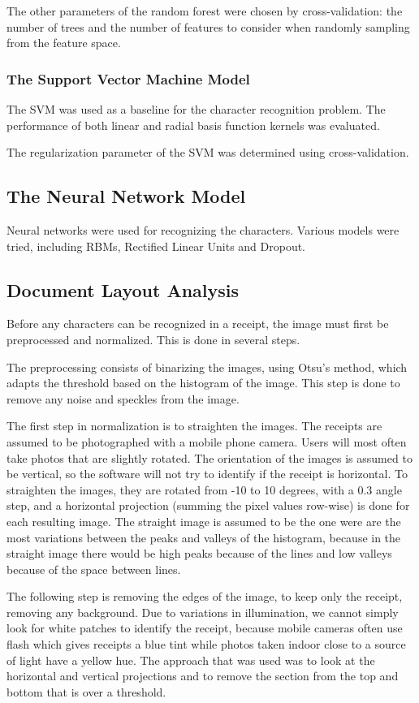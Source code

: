 The other parameters of the random forest were chosen by cross-validation: the number of trees and the number of features to consider when randomly sampling from the feature space. 

\subsubsection{The Support Vector Machine Model}
The SVM was used as a baseline for the character recognition problem. The performance of both linear and radial basis function kernels was evaluated. 

The regularization parameter of the SVM was determined using cross-validation. 

\subsection{The Neural Network Model}
Neural networks were used for recognizing the characters. Various models were tried, including RBMs, Rectified Linear Units and Dropout. 


\subsection{Document Layout Analysis}
Before any characters can be recognized in a receipt, the image must first be preprocessed and normalized. This is done in several steps. 

The preprocessing consists of binarizing the images, using Otsu's method\cite{otsu1975threshold}, which adapts the threshold based on the histogram of the image. This step is done to remove any noise and speckles from the image. 

The first step in normalization is to straighten the images. The receipts are assumed to be photographed with a mobile phone camera. Users will most often take photos that are slightly rotated. The orientation of the images is assumed to be vertical, so the software will not try to identify if the receipt is horizontal. To straighten the images, they are rotated from -10 to 10 degrees, with a 0.3 angle step, and a horizontal projection (summing the pixel values row-wise) is done for each resulting image. The straight image is assumed to be the one were are the most variations between the peaks and valleys of the histogram, because in the straight image there would be high peaks because of the lines and low valleys because of the space between lines. 

The following step is removing the edges of the image, to keep only the receipt, removing any background. Due to variations in illumination, we cannot simply look for white patches to identify the receipt, because mobile cameras often use flash which gives receipts a blue tint while photos taken indoor close to a source of light have a yellow hue. The approach that was used was to look at the horizontal and vertical projections and to remove the section from the top and bottom that is over a threshold. 

